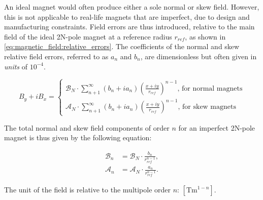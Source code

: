 An ideal magnet would  often produce either a sole normal or skew field. However, this is not
applicable to real-life magnets that are imperfect, due to design and manufacturing constraints.
Field errors are thus introduced, relative to the main field of the ideal 2N-pole magnet at a
reference radius $r_{ref}$, as shown in \cref{eq:magnetic_field:relative_errors}. The coefficients
of the normal and skew relative field errors, referred to as $a_n$ and $b_n$, are dimensionless but
often given in \textit{units} of $10^{-4}$.

\begin{equation}
    B_y + iB_x = 
        \begin{cases}
            \mathcal{B}_N \cdot \sum_{n+1}^\infty (b_n + ia_n) \left(\frac{x+iy}{r_{ref}}\right)^{n-1}\text{, for normal magnets}\\
            \mathcal{A}_N \cdot \sum_{n+1}^\infty (b_n + ia_n) \left(\frac{x+iy}{r_{ref}}\right)^{n-1}\text{, for skew magnets}
        \end{cases}
    \label{eq:magnetic_field:relative_errors}
\end{equation}

The total normal and skew field components of order $n$ for an imperfect 2N-pole magnet is thus
given by the following equation:

\begin{equation}
    \begin{aligned}
        \mathcal{B}_n &= \mathcal{B}_N \cdot \frac{b_n}{r_{ref}^{n-1}}, \\
        \mathcal{A}_n &= \mathcal{A}_N \cdot \frac{a_n}{r_{ref}^{n-1}}.
    \end{aligned}
\end{equation}

The unit of the field is relative to the multipole order $n$: $[\text{Tm}^{1-n}]$.



\subsection{}

\subsubsection{}

